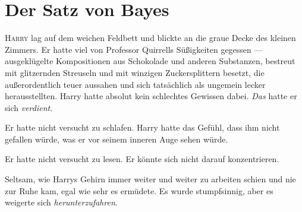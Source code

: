 \chapter{Der Satz von Bayes}


\lettrine{H}{arry} lag auf dem weichen Feldbett und blickte an die graue Decke des kleinen Zimmers. Er hatte viel von Professor Quirrells Süßigkeiten gegessen — ausgeklügelte Kompositionen aus Schokolade und anderen Substanzen, bestreut mit glitzernden Streuseln und mit winzigen Zuckersplittern besetzt, die außerordentlich teuer aussahen und sich tatsächlich als ungemein lecker herausstellten. Harry hatte absolut kein schlechtes Gewissen dabei. \emph{Das} hatte er sich \emph{verdient}.

Er hatte nicht versucht zu schlafen. Harry hatte das Gefühl, dass ihm nicht gefallen würde, was er vor seinem inneren Auge sehen würde.

Er hatte nicht versucht zu lesen. Er könnte sich nicht darauf konzentrieren.

Seltsam, wie Harrys Gehirn immer weiter und weiter zu arbeiten schien und nie zur Ruhe kam, egal wie sehr es ermüdete. Es wurde stumpfsinnig, aber es weigerte sich \emph{herunterzufahren}.

